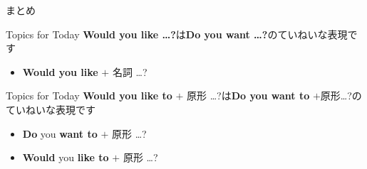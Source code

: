 \documentclass[aspectratio=169,xcolor={dvipsnames,table}]{beamer}
\begin{document}
\begin{frame}[plain]{まとめ}
\begin{block}{Topics for Today}\small
\textbf{Would you like \ldots ?}は\textbf{Do you want \ldots ?}のていねいな表現です
\begin{itemize}[square]\small
 \item \textbf{Would you like} $+$ 名詞 \ldots ?
       \end{itemize}
\end{block}

\begin{block}{Topics for Today}\small
\textbf{Would you like to} $+$ 原形 \ldots ?は\textbf{Do you want to} $+$原形\ldots ?のていねいな表現です
\begin{itemize}[square]\small
 \item \textbf{Do} you \textbf{want to} $+$ 原形 \ldots ?
 \item \textbf{Would} you \textbf{like to} $+$ 原形 \ldots ?
       \end{itemize}
\end{block}
\end{frame}
\end{document}

